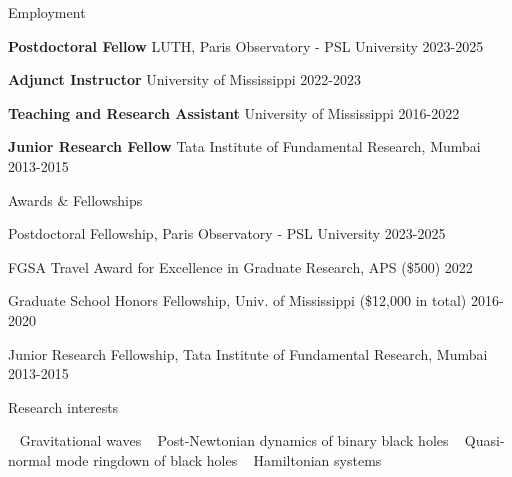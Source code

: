 \documentclass{resume} %
\begin{document}
\begin{rSection}{Employment}


{\bf  Postdoctoral Fellow } LUTH, Paris Observatory - PSL University 
     \hfill 2023-2025

{\bf Adjunct Instructor } University of Mississippi    \hfill 2022-2023  


{\bf Teaching and Research Assistant } University of Mississippi \hfill 2016-2022 


{\bf Junior Research Fellow} Tata Institute of Fundamental Research, Mumbai \hfill 2013-2015 


\end{rSection}



\begin{rSection}{Awards \& Fellowships}

Postdoctoral Fellowship, Paris Observatory - PSL University        \hfill 2023-2025

{ FGSA Travel Award for Excellence in Graduate Research}, APS (\$500)          \hfill     2022

{ Graduate School Honors Fellowship}, Univ. of Mississippi (\$12,000 in total)          \hfill 2016-2020 


{ Junior Research Fellowship}, Tata Institute of Fundamental Research, Mumbai \hfill 2013-2015 

\end{rSection}



 

\begin{rSection}{Research  interests}


\textbullet~ Gravitational waves
\textbullet~ Post-Newtonian dynamics of binary black holes
\textbullet~ Quasi-normal mode ringdown of black holes
\textbullet~ Hamiltonian systems  
\end{rSection} 
\end{document}
